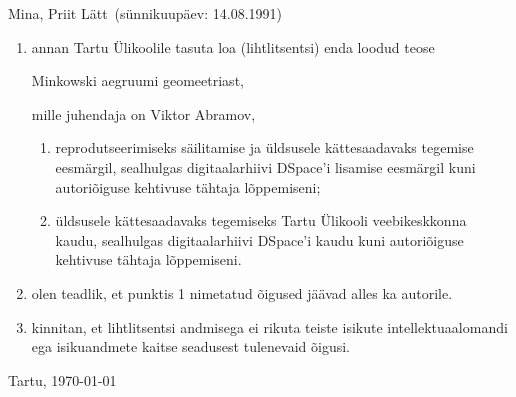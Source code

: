 \documentclass[12pt,a4paper,oneside]{article}
\theoremstyle{plain}
\theoremstyle{definition}
\numberwithin{equation}{section}
\def\title{Minkowski aegruumi geomeetriast}
\def\author{Priit Lätt}
\begin{document}
Mina, \author\ (sünnikuupäev: 14.08.1991)
\begin{enumerate}
	\item annan Tartu Ülikoolile tasuta loa (lihtlitsentsi) 
	enda loodud teose
	\begin{center}
	\title,
	\end{center}
	mille juhendaja on Viktor Abramov,
	\begin{enumerate}
		\item reprodutseerimiseks säilitamise ja üldsusele 
		kättesaadavaks tegemise eesmärgil, sealhulgas 
		digitaalarhiivi DSpace'i lisamise eesmärgil kuni 
		autoriõiguse kehtivuse tähtaja lõppemiseni;
		\item üldsusele kättesaadavaks tegemiseks Tartu Ülikooli 
		veebikeskkonna kaudu, sealhulgas digitaalarhiivi 
		DSpace'i kaudu kuni autoriõiguse kehti\-vuse tähtaja lõppemiseni.
	\end{enumerate}
	\item olen teadlik, et punktis 1 nimetatud õigused jäävad 
	alles ka autorile.
	\item kinnitan, et lihtlitsentsi andmisega ei rikuta teiste 
	isikute intellektuaal\-o\-mandi ega isikuandmete kaitse 
	seadusest tulenevaid õigusi.
\end{enumerate}

\vfill

\begin{center}
Tartu, \ddmmyyyydate \today
\end{center}
\end{document}
